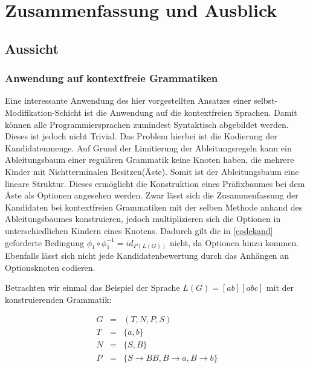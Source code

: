 \documentclass[a4paper,12pt]{report}
\begin{document}

\chapter{Zusammenfassung und Ausblick}
\label{ausblick}

\section*{Aussicht}

\subsection*{Anwendung auf kontextfreie Grammatiken}

Eine interessante Anwendung des hier vorgestellten Ansatzes einer selbst-Modifikation-Schicht ist die Anwendung auf die kontextfreien Sprachen. Damit können alle Programmiersprachen zumindest Syntaktisch abgebildet werden. Dieses ist jedoch nicht Trivial. Das Problem hierbei ist die Kodierung der Kandidatenmenge. Auf Grund der Limitierung der Ableitungsregeln kann ein Ableitungsbaum einer regulären Grammatik keine Knoten haben, die mehrere Kinder mit Nichtterminalen Besitzen(Äste). Somit ist der Ableitungsbaum eine lineare Struktur. Dieses ermöglicht die Konstruktion eines Präfixbaumes bei dem Äste als Optionen angesehen werden. 
Zwar lässt sich die Zusammenfassung der Kandidaten bei kontextfreien Grammatiken mit der selben Methode anhand des Ableitungsbaumes konstruieren, jedoch multiplizieren sich die Optionen in unterschiedlichen Kindern eines Knotens. Dadurch gilt die in \ref{codekand} geforderte Bedingung $\phi_1\circ\phi_1^{-1} = id_{P(L(G))}$ nicht, da Optionen hinzu kommen. Ebenfalls lässt sich nicht jede Kandidatenbewertung durch das Anhängen an Optionsknoten codieren.

Betrachten wir einmal das Beispiel der Sprache $L(G) = { [ab][abc] }$ mit der konstruierenden Grammatik: 

\begin{eqnarray}
  G &=& (T,N,P,S)\\
  T &=& \{ a, b \}\\
  N &=& \{ S, B \} \\
  P &=& \{ S\rightarrow BB, B\rightarrow a, B\rightarrow b\}
\end{eqnarray}
\end{document}
